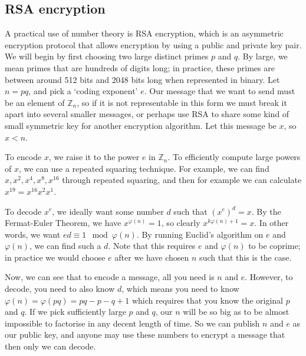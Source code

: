 \subsection{RSA encryption}
A practical use of number theory is RSA encryption, which is an asymmetric encryption protocol that allows encryption by using a public and private key pair.
We will begin by first choosing two large distinct primes \(p\) and \(q\).
By large, we mean primes that are hundreds of digits long; in practice, these primes are between around 512 bits and 2048 bits long when represented in binary.
Let \(n=pq\), and pick a `coding exponent' \(e\).
Our message that we want to send must be an element of \(\mathbb Z_n\), so if it is not representable in this form we must break it apart into several smaller messages, or perhaps use RSA to share some kind of small symmetric key for another encryption algorithm.
Let this message be \(x\), so \(x < n\).

To encode \(x\), we raise it to the power \(e\) in \(\mathbb Z_n\).
To efficiently compute large powers of \(x\), we can use a repeated squaring technique.
For example, we can find \(x, x^2, x^4, x^8, x^{16}\) through repeated squaring, and then for example we can calculate \(x^{19} = x^{16} x^{2} x^{1}\).

To decode \(x^e\), we ideally want some number \(d\) such that \((x^e)^d = x\).
By the Fermat-Euler Theorem, we have \(x^{\varphi(n)} = 1\), so clearly \(x^{k\varphi(n) + 1} = x\).
In other words, we want \(ed \equiv 1 \mod \varphi(n)\).
By running Euclid's algorithm on \(e\) and \(\varphi(n)\), we can find such a \(d\).
Note that this requires \(e\) and \(\varphi(n)\) to be coprime; in practice we would choose \(e\) after we have chosen \(n\) such that this is the case.

Now, we can see that to encode a message, all you need is \(n\) and \(e\).
However, to decode, you need to also know \(d\), which means you need to know \(\varphi(n) = \varphi(pq) = pq - p - q + 1\) which requires that you know the original \(p\) and \(q\).
If we pick sufficiently large \(p\) and \(q\), our \(n\) will be so big as to be almost impossible to factorise in any decent length of time.
So we can publish \(n\) and \(e\) as our public key, and anyone may use these numbers to encrypt a message that then only we can decode.
